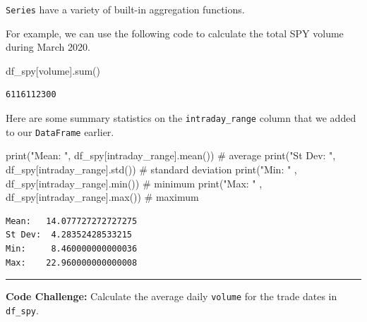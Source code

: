 \documentclass[
  letterpaper,
  DIV=11,
  numbers=noendperiod]{scrreprt}
\newenvironment{Shaded}{\begin{snugshade}}{\end{snugshade}}
\newcommand{\BuiltInTok}[1]{\textcolor[rgb]{0.00,0.23,0.31}{#1}}
\newcommand{\CommentTok}[1]{\textcolor[rgb]{0.37,0.37,0.37}{#1}}
\newcommand{\NormalTok}[1]{\textcolor[rgb]{0.00,0.23,0.31}{#1}}
\newcommand{\StringTok}[1]{\textcolor[rgb]{0.13,0.47,0.30}{#1}}
\begin{document}
\texttt{Series} have a variety of built-in aggregation functions.

For example, we can use the following code to calculate the total SPY
volume during March 2020.

\begin{Shaded}
\begin{Highlighting}[]
\NormalTok{df\_spy[}\StringTok{\textquotesingle{}volume\textquotesingle{}}\NormalTok{].}\BuiltInTok{sum}\NormalTok{()}
\end{Highlighting}
\end{Shaded}

\begin{verbatim}
6116112300
\end{verbatim}

Here are some summary statistics on the \texttt{intraday\_range} column
that we added to our \texttt{DataFrame} earlier.

\begin{Shaded}
\begin{Highlighting}[]
\BuiltInTok{print}\NormalTok{(}\StringTok{"Mean:  "}\NormalTok{, df\_spy[}\StringTok{\textquotesingle{}intraday\_range\textquotesingle{}}\NormalTok{].mean()) }\CommentTok{\# average}
\BuiltInTok{print}\NormalTok{(}\StringTok{"St Dev: "}\NormalTok{, df\_spy[}\StringTok{\textquotesingle{}intraday\_range\textquotesingle{}}\NormalTok{].std()) }\CommentTok{\# standard deviation}
\BuiltInTok{print}\NormalTok{(}\StringTok{"Min:    "}\NormalTok{ , df\_spy[}\StringTok{\textquotesingle{}intraday\_range\textquotesingle{}}\NormalTok{].}\BuiltInTok{min}\NormalTok{()) }\CommentTok{\# minimum}
\BuiltInTok{print}\NormalTok{(}\StringTok{"Max:   "}\NormalTok{ , df\_spy[}\StringTok{\textquotesingle{}intraday\_range\textquotesingle{}}\NormalTok{].}\BuiltInTok{max}\NormalTok{()) }\CommentTok{\# maximum}
\end{Highlighting}
\end{Shaded}

\begin{verbatim}
Mean:   14.077727272727275
St Dev:  4.28352428533215
Min:     8.460000000000036
Max:    22.960000000000008
\end{verbatim}

\begin{center}\rule{0.5\linewidth}{0.5pt}\end{center}

\textbf{Code Challenge:} Calculate the average daily \texttt{volume} for
the trade dates in \texttt{df\_spy}.
\end{document}
